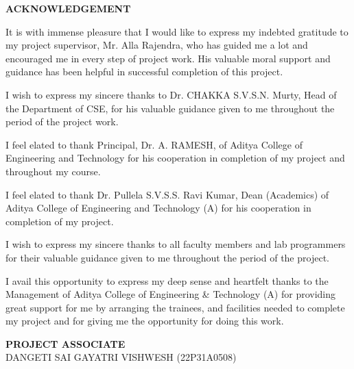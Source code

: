 \begin{center}
{\bfseries\fontsize{16}{18}\selectfont ACKNOWLEDGEMENT}
\end{center}

\vspace{0.5cm}
\noindent
It is with immense pleasure that I would like to express my indebted gratitude to my project supervisor,
Mr. Alla Rajendra, who has guided me a lot and encouraged me in every step of project work.
His valuable moral support and guidance has been helpful in successful completion of this project.

\vspace{0.3cm}

\noindent
I wish to express my sincere thanks to Dr. CHAKKA S.V.S.N. Murty, Head of the Department of CSE,
for his valuable guidance given to me throughout the period of the project work.

\vspace{0.3cm}

\noindent
I feel elated to thank Principal, Dr. A. RAMESH, of Aditya College of Engineering and Technology
for his cooperation in completion of my project and throughout my course.

\vspace{0.3cm}

\noindent
I feel elated to thank Dr. Pullela S.V.S.S. Ravi Kumar, Dean (Academics) of Aditya College of Engineering and Technology (A)
for his cooperation in completion of my project.

\vspace{0.3cm}

\noindent
I wish to express my sincere thanks to all faculty members and lab programmers for their valuable guidance
given to me throughout the period of the project.

\vspace{0.3cm}

\noindent
I avail this opportunity to express my deep sense and heartfelt thanks to the Management of
Aditya College of Engineering \& Technology (A) for providing great support for me by arranging the trainees,
and facilities needed to complete my project and for giving me the opportunity for doing this work.

\vspace{2cm}

\begin{flushright}
\textbf{PROJECT ASSOCIATE}\\[0.5cm]

DANGETI SAI GAYATRI VISHWESH (22P31A0508)
\end{flushright}